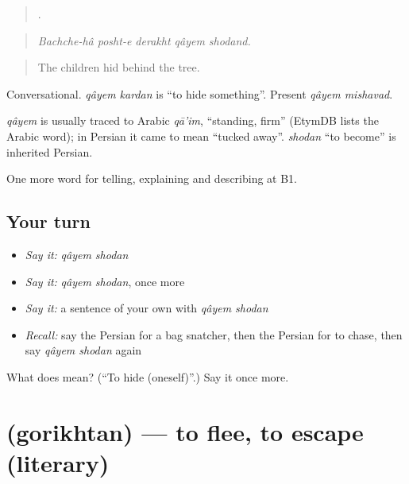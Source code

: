 \begin{quote}
     .
\end{quote}

\begin{quote}
\emph{Bachche-hâ posht-e derakht qâyem shodand.}
\end{quote}

\begin{quote}
The children hid behind the tree.
\end{quote}

Conversational. \emph{qâyem kardan} is \textquotedblleft{}to hide something\textquotedblright{}. Present \emph{qâyem mishavad}.

\begin{cousinweb}
\emph{qâyem} is usually traced to Arabic \emph{qā'im}, \textquotedblleft{}standing, firm\textquotedblright{} (EtymDB lists the Arabic word); in Persian it came to mean \textquotedblleft{}tucked away\textquotedblright{}. \emph{shodan} \textquotedblleft{}to become\textquotedblright{} is inherited Persian.
\end{cousinweb}

\begin{grammarlens}[title={What you've built}]
One more word for telling, explaining and describing at B1.
\end{grammarlens}

\subsection*{Your turn}
\begin{itemize}
\raggedright
  \item \emph{Say it:} \emph{qâyem shodan}
  \item \emph{Say it:} \emph{qâyem shodan}, once more
  \item \emph{Say it:} a sentence of your own with \emph{qâyem shodan}
  \item \emph{Recall:} say the Persian for a bag snatcher, then the Persian for to chase, then say \emph{qâyem shodan} again
\end{itemize}

\begin{tcolorbox}[breakable,colback=teal!4,colframe=teal!35!black,title={Before you move on}]
What does   mean? (\textquotedblleft{}To hide (oneself)\textquotedblright{}.) Say it once more.
\end{tcolorbox}
\section[\texorpdfstring{\fa{گریختن} (gorikhtan)}{گریختن (gorikhtan)}]{ (gorikhtan) — to flee, to escape (literary)}


